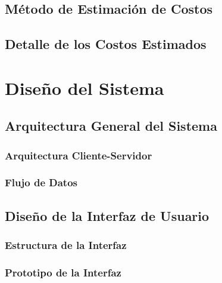 \subsection{Método de Estimación de Costos}
\subsection{Detalle de los Costos Estimados}

\section{Diseño del Sistema}
\subsection{Arquitectura General del Sistema}
\subsubsection{Arquitectura Cliente-Servidor}
\subsubsection{Flujo de Datos}

\subsection{Diseño de la Interfaz de Usuario}
\subsubsection{Estructura de la Interfaz}
\subsubsection{Prototipo de la Interfaz}
